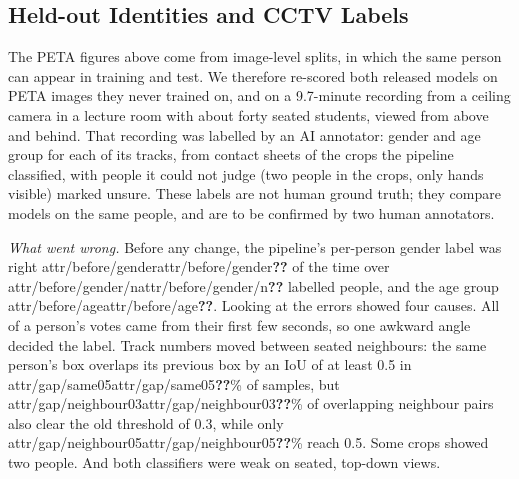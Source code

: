 
\providecommand{\attr}[1]{%
  \ifcsname attr/#1\endcsname\csname attr/#1\endcsname\else\textbf{??}\fi}

\subsection{Held-out Identities and CCTV Labels}
\label{sec:cctv}
The PETA figures above come from image-level splits, in which the same person can
appear in training and test. We therefore re-scored both released models on PETA
images they never trained on, and on a 9.7-minute recording from a ceiling camera
in a lecture room with about forty seated students, viewed from above and behind.
That recording was labelled by an AI annotator: gender and age group for each of
its tracks, from contact sheets of the crops the pipeline classified, with people
it could not judge (two people in the crops, only hands visible) marked unsure.
These labels are not human ground truth; they compare models on the same people,
and are to be confirmed by two human annotators.

\emph{What went wrong.} Before any change, the pipeline's per-person gender label
was right \attr{before/gender} of the time over \attr{before/gender/n} labelled
people, and the age group \attr{before/age}. Looking at the errors showed four
causes. All of a person's votes came from their first few seconds, so one awkward
angle decided the label. Track numbers moved between seated neighbours: the same
person's box overlaps its previous box by an IoU of at least 0.5 in
\attr{gap/same05}\% of samples, but \attr{gap/neighbour03}\% of overlapping
neighbour pairs also clear the old threshold of 0.3, while only
\attr{gap/neighbour05}\% reach 0.5. Some crops showed two people. And both
classifiers were weak on seated, top-down views.

